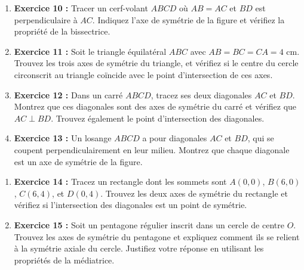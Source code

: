 \documentclass{article}
\begin{document}
\begin{tcolorbox}[colback=yellow!10!white, colframe=yellow!75!black, title=\textcolor{white}{Exercices}, sharp corners=south]
\begin{enumerate}
        \item \textbf{Exercice 10 :} Tracer un cerf-volant \( ABCD \) où \( AB = AC \) et \( BD \) est perpendiculaire à \( AC \). Indiquez l'axe de symétrie de la figure et vérifiez la propriété de la bissectrice.
        
        \item \textbf{Exercice 11 :} Soit le triangle équilatéral \( ABC \) avec \( AB = BC = CA = 4 \) cm. Trouvez les trois axes de symétrie du triangle, et vérifiez si le centre du cercle circonscrit au triangle coïncide avec le point d'intersection de ces axes.

        \item \textbf{Exercice 12 :} Dans un carré \( ABCD \), tracez ses deux diagonales \( AC \) et \( BD \). Montrez que ces diagonales sont des axes de symétrie du carré et vérifiez que \( AC \perp BD \). Trouvez également le point d'intersection des diagonales.

        \item \textbf{Exercice 13 :} Un losange \( ABCD \) a pour diagonales \( AC \) et \( BD \), qui se coupent perpendiculairement en leur milieu. Montrez que chaque diagonale est un axe de symétrie de la figure.
    \end{enumerate}
\end{tcolorbox}

\begin{tcolorbox}[colback=yellow!10!white, colframe=brown!75!black, title=\textcolor{white}{Pour allez plus loin}, sharp corners=south]

    \begin{enumerate}
        \item \textbf{Exercice 14 :} Tracez un rectangle dont les sommets sont \( A(0, 0) \), \( B(6, 0) \), \( C(6, 4) \), et \( D(0, 4) \). Trouvez les deux axes de symétrie du rectangle et vérifiez si l'intersection des diagonales est un point de symétrie.

        \item \textbf{Exercice 15 :} Soit un pentagone régulier inscrit dans un cercle de centre \( O \). Trouvez les axes de symétrie du pentagone et expliquez comment ils se relient à la symétrie axiale du cercle. Justifiez votre réponse en utilisant les propriétés de la médiatrice.
    \end{enumerate}
\end{tcolorbox}
\end{document}
